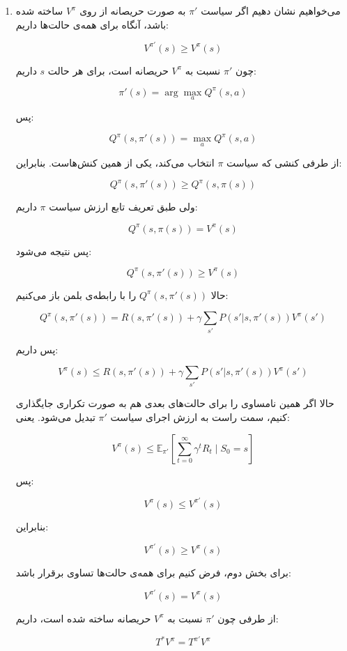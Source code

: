 \begin{enumerate}
در نتیجه سیاست حریصانه‌ی جدید برابر است با:

\[
\boxed{
\pi_2(A)=x,\qquad \pi_2(B)=x,\qquad \pi_2(C)=x
}
\]

\item[\textbf{ج)}]

می‌خواهیم نشان دهیم اگر سیاست \(\pi'\) به صورت حریصانه از روی \(V^\pi\) ساخته شده باشد، آنگاه برای همه‌ی حالت‌ها داریم:

\[
V^{\pi'}(s)\ge V^\pi(s)
\]

چون \(\pi'\) نسبت به \(V^\pi\) حریصانه است، برای هر حالت \(s\) داریم:

\[
\pi'(s)=\arg\max_a Q^\pi(s,a)
\]

پس:

\[
Q^\pi(s,\pi'(s))=\max_a Q^\pi(s,a)
\]

از طرفی کنشی که سیاست \(\pi\) انتخاب می‌کند، یکی از همین کنش‌هاست. بنابراین:

\[
Q^\pi(s,\pi'(s))\ge Q^\pi(s,\pi(s))
\]

ولی طبق تعریف تابع ارزش سیاست \(\pi\) داریم:

\[
Q^\pi(s,\pi(s))=V^\pi(s)
\]

پس نتیجه می‌شود:

\[
Q^\pi(s,\pi'(s))\ge V^\pi(s)
\]

حالا \(Q^\pi(s,\pi'(s))\) را با رابطه‌ی بلمن باز می‌کنیم:

\[
Q^\pi(s,\pi'(s))
=
R(s,\pi'(s))
+
\gamma
\sum_{s'}P(s'|s,\pi'(s))V^\pi(s')
\]

پس داریم:

\[
V^\pi(s)
\le
R(s,\pi'(s))
+
\gamma
\sum_{s'}P(s'|s,\pi'(s))V^\pi(s')
\]

حالا اگر همین نامساوی را برای حالت‌های بعدی هم به صورت تکراری جایگذاری کنیم، سمت راست به ارزش اجرای سیاست \(\pi'\) تبدیل می‌شود. یعنی:

\[
V^\pi(s)
\le
\mathbb{E}_{\pi'}\left[
\sum_{t=0}^{\infty}\gamma^t R_t
\mid S_0=s
\right]
\]

پس:

\[
V^\pi(s)\le V^{\pi'}(s)
\]

بنابراین:

\[
\boxed{
V^{\pi'}(s)\ge V^\pi(s)
}
\]

برای بخش دوم، فرض کنیم برای همه‌ی حالت‌ها تساوی برقرار باشد:

\[
V^{\pi'}(s)=V^\pi(s)
\]

از طرفی چون \(\pi'\) نسبت به \(V^\pi\) حریصانه ساخته شده است، داریم:

\[
T^*V^\pi = T^{\pi'}V^\pi
\]


\end{enumerate}
